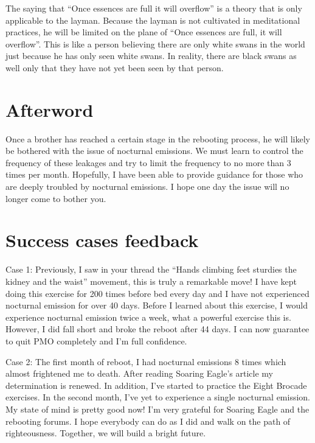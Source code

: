 \documentclass[
]{book}
\begin{document}
The saying that ``Once essences are full it will overflow'' is a theory that is only applicable to the layman. Because the layman is not cultivated in meditational practices, he will be limited on the plane of ``Once essences are full, it will overflow''. This is like a person believing there are only white swans in the world just because he has only seen white swans. In reality, there are black swans as well only that they have not yet been seen by that person.

\hypertarget{afterword}{%
\section{Afterword}\label{afterword}}

Once a brother has reached a certain stage in the rebooting process, he will likely be bothered with the issue of nocturnal emissions. We must learn to control the frequency of these leakages and try to limit the frequency to no more than 3 times per month. Hopefully, I have been able to provide guidance for those who are deeply troubled by nocturnal emissions. I hope one day the issue will no longer come to bother you.

\hypertarget{success-cases-feedback}{%
\section{Success cases feedback}\label{success-cases-feedback}}

Case 1: Previously, I saw in your thread the ``Hands climbing feet sturdies the kidney and the waist'' movement, this is truly a remarkable move! I have kept doing this exercise for 200 times before bed every day and I have not experienced nocturnal emission for over 40 days. Before I learned about this exercise, I would experience nocturnal emission twice a week, what a powerful exercise this is. However, I did fall short and broke the reboot after 44 days. I can now guarantee to quit PMO completely and I'm full confidence.

Case 2: The first month of reboot, I had nocturnal emissions 8 times which almost frightened me to death. After reading Soaring Eagle's article my determination is renewed. In addition, I've started to practice the Eight Brocade exercises. In the second month, I've yet to experience a single nocturnal emission. My state of mind is pretty good now! I'm very grateful for Soaring Eagle and the rebooting forums. I hope everybody can do as I did and walk on the path of righteousness. Together, we will build a bright future.
\end{document}
